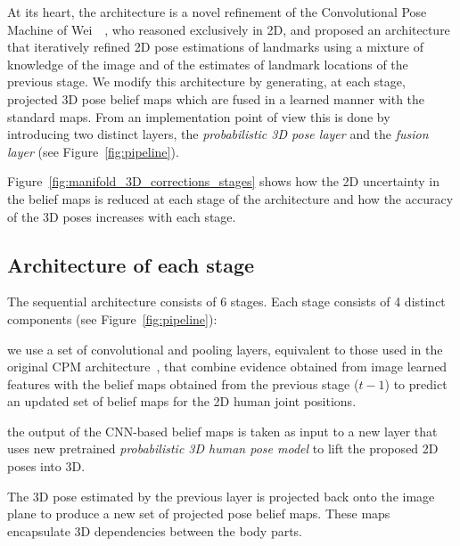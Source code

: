 \documentclass[10pt,twocolumn,letterpaper]{article}
\begin{document}
At its heart, the  architecture is a novel refinement of the
Convolutional Pose Machine of Wei~\etal~\cite{wei2016convolutional}, who reasoned exclusively in
2D, and proposed an architecture that iteratively refined 2D pose
estimations of landmarks using a mixture of knowledge of the image and
of the estimates of landmark locations of the previous stage. We
modify this architecture by generating, at each stage, projected 3D
pose belief maps which are fused in a learned manner with the standard
maps. From an implementation point of view this is done by introducing
two distinct layers, the \textit{probabilistic 3D pose layer} and the
\textit{fusion layer} (see Figure~\ref{fig:pipeline}).

Figure~\ref{fig:manifold_3D_corrections_stages} shows how the 2D
uncertainty in the belief maps is reduced at each stage of the
architecture and how the accuracy of the 3D poses increases with each
stage. 

\subsection{Architecture of each stage}
The sequential architecture consists of 6 stages. Each stage consists of 4
distinct components (see Figure~\ref{fig:pipeline}):

 we use a set of
convolutional and pooling layers, equivalent to those used in the
original CPM architecture~\cite{wei2016convolutional}, that combine
evidence obtained from image learned features with the belief maps
obtained from the previous stage ($t-1$) to predict an updated set of
belief maps for the 2D human joint positions.

 the output of the
CNN-based belief maps is taken as input to a new layer that uses new
pretrained \emph{probabilistic 3D human pose model} to lift the
proposed 2D poses into 3D. %

 The 3D pose estimated by
the previous layer is projected back onto the image plane to produce a
new set of projected pose belief maps. These maps encapsulate 3D
dependencies between the body parts. %
\end{document}
